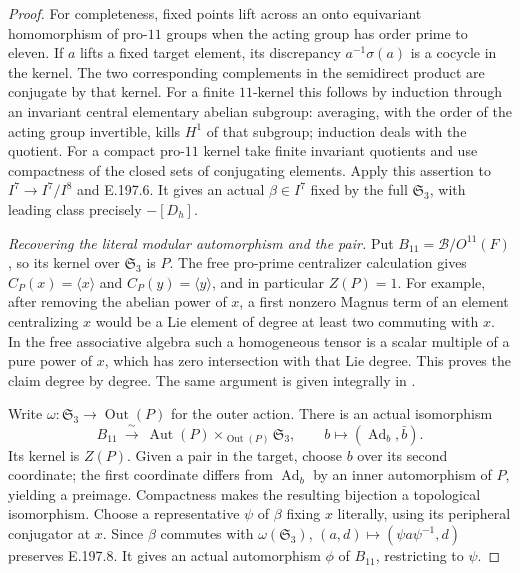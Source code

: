 \begin{proof}
For completeness, fixed points lift across an onto equivariant
homomorphism of pro-\(11\) groups when the acting group has
order prime to eleven.  If \(a\) lifts a fixed target element,
its discrepancy \(a^{-1}\sigma(a)\) is a cocycle in the
kernel.  The two corresponding complements in the semidirect
product are conjugate by that kernel.  For a finite
\(11\)-kernel this follows by induction through an invariant
central elementary abelian subgroup: averaging, with the order
of the acting group invertible, kills \(H^1\) of that subgroup;
induction deals with the quotient.  For a compact pro-\(11\)
kernel take finite invariant quotients and use compactness of
the closed sets of conjugating elements.  Apply this assertion
to \(I^7\to I^7/I^8\) and E.197.6.  It gives an actual
\(\beta\in I^7\) fixed by the full \(\mathfrak S_3\),
with leading class precisely \(-[D_h]\).

\emph{Recovering the literal modular automorphism and the pair.}
Put \(B_{11}=\mathcal B/O^{11}(F)\), so its kernel over
\(\mathfrak S_3\) is \(P\).  The free pro-prime centralizer
calculation gives \(C_P(x)=\langle x\rangle\) and
\(C_P(y)=\langle y\rangle\), and in particular \(Z(P)=1\).
For example, after removing the abelian power of \(x\), a
first nonzero Magnus term of an element centralizing \(x\)
would be a Lie element of degree at least two commuting with
\(x\).  In the free associative algebra such a homogeneous
tensor is a scalar multiple of a pure power of \(x\), which
has zero intersection with that Lie degree.  This proves the
claim degree by degree.  The same argument is given integrally
in \citet[Lemma~2.2, p.~368]{SymCohenPrassidis2006}.

Write \(\omega:\mathfrak S_3\to\operatorname{Out}(P)\)
for the outer action.  There is an actual isomorphism
\[
B_{11}\ \xrightarrow{\ \sim\ }\ 
\operatorname{Aut}(P)
             \mathbin{\times_{\operatorname{Out}(P)}}
                          \mathfrak S_3,
\qquad b\longmapsto(\operatorname{Ad}_b,\bar b).
\tag{E.197.8}
\]
Its kernel is \(Z(P)\).  Given a pair in the target, choose
\(b\) over its second coordinate; the first coordinate differs
from \(\operatorname{Ad}_b\) by an inner automorphism of
\(P\), yielding a preimage.  Compactness makes the resulting
bijection a topological isomorphism.
Choose a representative \(\psi\) of \(\beta\) fixing
\(x\) literally, using its peripheral conjugator at \(x\).
Since \(\beta\) commutes with \(\omega(\mathfrak S_3)\),
\((a,d)\mapsto(\psi a\psi^{-1},d)\) preserves E.197.8.
It gives an actual automorphism \(\phi\) of \(B_{11}\),
restricting to \(\psi\).


\end{proof}
